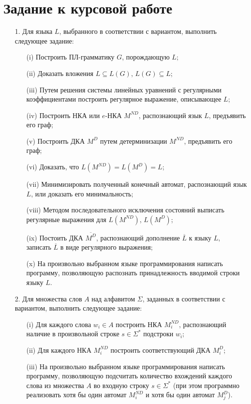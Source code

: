 \renewcommand{\theAlgoEnv}{\Alph{chapter}.\arabic{AlgoEnv}}

\chapter{Задание к курсовой работе}
\begin{itemize}
\item[1.] Для языка $L$, выбранного в соответствии с вариантом, выполнить следующее задание:
\begin{itemize}
\item[(i)] Построить ПЛ-грамматику $G$, порождающую $L$;
\item[(ii)] Доказать вложения $L\subseteq L(G)$, $L(G)\subseteq L$;
\item[(iii)] Путем решения системы линейных уравнений с регулярными коэффициентами построить регулярное выражение, описывающее $L$;
\item[(iv)] Построить НКА или $e$-НКА $M^{ND}$, распознающий язык $L$, предъявить его граф;
\item[(v)] Построить ДКА $M^{D}$ путем детерминизации $M^{ND}$, предъявить его граф;
\item[(vi)] Доказать, что $L(M^{ND})=L(M^{D})=L$;
\item[(vii)] Минимизировать полученный конечный автомат, распознающий язык $L$, или доказать его минимальность;
\item[(viii)] Методом последовательного исключения состояний выписать регулярные выражения для $L(M^{ND})$, $L(M^{D})$;
\item[(ix)] Постоить ДКА $\overline{M^D}$, распознающий дополнение $\overline{L}$ к языку $L$, записать $\overline{L}$ в виде регулярного выражения;
\item[(x)] На произвольно выбранном языке программирования написать программу, позволяющую распознать принадлежность вводимой строки языку $L$.
\end{itemize}

\item[2.] Для множества слов $A$ над алфавитом $\Sigma$, заданных в соответствии с вариантом, выполнить следующее задание:
\begin{itemize}
\item[(i)] Для каждого слова $w_i\in A$ построить НКА $M^{ND}_i$, распознающий наличие в произвольной строке $s\in\Sigma^\ast$ подстроки $w_i$;
\item[(ii)] Для каждого НКА $M^{ND}_i$ построить соответствующий ДКА $M^D_i$;
\item[(iii)] На произвольно выбранном языке программирования написать программу, позволяющую подсчитать количество вхождений каждого слова из множества $A$ во входную строку $s\in\Sigma^\ast$ (при этом программно реализовать хотя бы один автомат $M^{ND}_i$ и хотя бы один автомат $M^D_j$).
\end{itemize}


\end{itemize}
